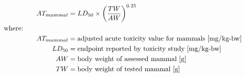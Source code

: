 \documentclass[12pt, A4]{article}
\begin{document}
\begin{align}
AT_{mammal} & = LD_{50} \times \left (\frac{TW}{AW} \right )^{0.25} \nonumber \\
&    \hspace{-1.3in}  \text{where:} \nonumber \\
AT_{mammal} & = \text{adjusted acute toxicity value for mammals [mg/kg-bw]} \nonumber \\
LD_{50} & =\text{endpoint reported by toxicity study [mg/kg-bw]} \nonumber \\
AW & = \text{body weight of assessed mammal [g]} \nonumber \\
TW & = \text{body weight of tested mammal [g]} \nonumber 
\end{align} 
\end{document}
